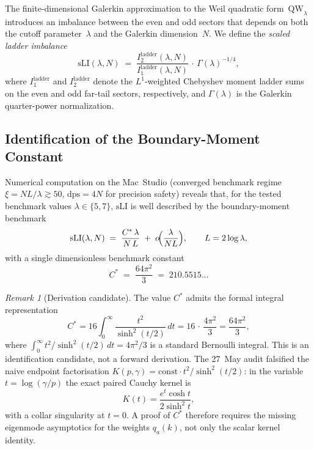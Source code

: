 \documentclass[12pt,a4paper]{article}
\theoremstyle{definition}
\theoremstyle{remark}
\newtheorem{remark}[theorem]{Remark}
\begin{document}
The finite-dimensional Galerkin approximation to the Weil quadratic form~$\mathrm{QW}_\lambda$ introduces an imbalance between the even and odd sectors that depends on both the cutoff parameter~$\lambda$ and the Galerkin dimension~$N$. We define the \emph{scaled ladder imbalance}
\begin{equation}
\label{eq:sLI}
\mathrm{sLI}(\lambda, N) \;=\; \frac{I_2^{\mathrm{ladder}}(\lambda,N)}{I_1^{\mathrm{ladder}}(\lambda,N)}\,\cdot\,\Gamma(\lambda)^{-1/4},
\end{equation}
where $I_1^{\mathrm{ladder}}$ and $I_2^{\mathrm{ladder}}$ denote the $L^1$-weighted Chebyshev moment ladder sums on the even and odd far-tail sectors, respectively, and $\Gamma(\lambda)$ is the Galerkin quarter-power normalization.

\subsection{Identification of the Boundary-Moment Constant}

Numerical computation on the Mac~Studio (converged benchmark regime
$\xi=NL/\lambda \gtrsim 50$, $\mathrm{dps} = 4N$ for precision
safety) reveals that, for the tested benchmark values
$\lambda\in\{5,7\}$, $\mathrm{sLI}$ is well described by the
boundary-moment benchmark
\begin{equation}
\label{eq:gf1-scaling}
\mathrm{sLI}(\lambda, N) \;=\; \frac{C^*\,\lambda}{N\,L} \;+\; o\!\Bigl(\frac{\lambda}{NL}\Bigr), \qquad L = 2\log\lambda,
\end{equation}
with a single dimensionless benchmark constant
\begin{equation}
\label{eq:Cstar}
C^* \;=\; \frac{64\pi^2}{3} \;=\; 210.5515\ldots
\end{equation}

\begin{remark}[Derivation candidate]
\label{rem:cstar-derivation}
The value $C^*$ admits the formal integral representation
\[
C^* = 16 \int_0^\infty \frac{t^2}{\sinh^2(t/2)}\,dt = 16\,\cdot\,\frac{4\pi^2}{3} = \frac{64\pi^2}{3},
\]
where $\int_0^\infty t^2/\sinh^2(t/2)\,dt = 4\pi^2/3$ is a standard Bernoulli integral. This is an identification candidate, not a forward derivation. The 27~May audit falsified the naive endpoint factorisation
$K(p,\gamma)=\mathrm{const}\cdot t^2/\sinh^2(t/2)$: in the variable
$t=\log(\gamma/p)$ the exact paired Cauchy kernel is
\[
  K(t)=\frac{e^t\cosh t}{2\sinh^2 t},
\]
with a collar singularity at $t=0$. A proof of $C^*$ therefore requires
the missing eigenmode asymptotics for the weights $q_a(k)$, not only the
scalar kernel identity.
\end{remark}
\end{document}

